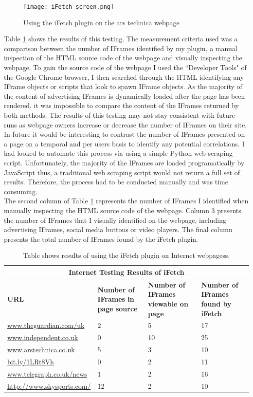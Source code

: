 \documentclass[12pt]{article}
\begin{document}
\begin{figure}[H]
    \centering
    \texttt{[image: iFetch\_screen.png]}
    \caption{Using the iFetch plugin on the ars technica webpage}
    \label{fig:iFetch_screen}
\end{figure}

Table \ref{table:3} shows the results of this testing. The measurement criteria used was a comparison between the number of IFrames identified by my plugin, a manual inspection of the HTML source code of the webpage and visually inspecting the webpage. To gain the source code of the webpage I used the ``Developer Tools" of the Google Chrome browser, I then searched through the HTML identifying any IFrame objects or scripts that look to spawn IFrame objects.  As the majority of the content of advertising IFrames is dynamically loaded after the page has been rendered, it was impossible to compare the content of the IFrames returned by both methods. The results of this testing may not stay consistent with future runs as webpage owners increase or decrease the number of IFrames on their site. In future it would be interesting to contrast the number of IFrames presented on a page on a temporal and per users basis to identify any potential correlations. I had looked to automate this process via using a simple Python web scraping script. Unfortunately, the majority of the IFrames are loaded programatically by JavaScript thus, a traditional web scraping script would not return a full set of results. Therefore, the process had to be conducted manually and was time consuming. \\

The second column of Table \ref{table:3} represents the number of IFrames I identified when manually inspecting the HTML source code of the webpage. Column 3 presents the number of IFrames that I visually identified on the webpage, including advertising IFrames, social media buttons or video players. The final column presents the total number of IFrames found by the iFetch plugin.    

{
\begin{table} [H]
\centering
\begin{tabular}{ |p{4cm}|p{3cm}|p{3cm}| p{3cm} | }
\hline
\multicolumn{4}{|c|}{\textbf{Internet Testing Results of iFetch}} \\
\hline
\textbf{URL} & \textbf{Number of IFrames in page source} & \textbf{Number of IFrames viewable on page} & \textbf{Number of IFrames found by iFetch} \\
\hline
\url{www.theguardian.com/uk} & 2 & 5 & 17 \\
\hline
\url{www.independent.co.uk} & 0 & 10 & 25 \\
\hline
\url{www.arstechnica.co.uk} & 5 & 3 & 10  \\
\hline
\url{bit.ly/1LRt8Vh} & 0 & 2 & 11 \\
\hline
\url{www.telegraph.co.uk/news} & 1 & 2 & 16\\
\hline
\url{http://www.skysports.com/} & 12 & 2 & 10\\
\hline
\end{tabular}
\caption{Table shows results of using the iFetch plugin on Internet webpagess.}
\label{table:3}
\end{table}
}
\end{document}
